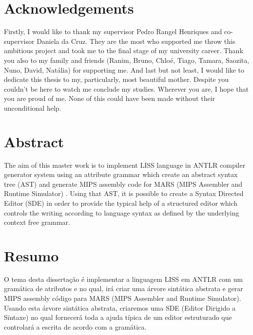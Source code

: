 \documentclass[
  oneside,
  11pt, a4paper,
  footinclude=true,
  headinclude=true,
  cleardoublepage=empty
]{scrbook}
\author{Damien da Silva Vaz}
\date{\myear} %
\begin{document}
	\umfrontcover	
	\umtitlepage
	
	\chapter*{Acknowledgements}
	Firstly, I would like to thank my supervisor Pedro Rangel Henriques and co-supervisor Daniela da Cruz. They are the most who supported me throw this ambitious project and took me to the final stage of my university career.\newline
Thank you also to my family and friends (Ranim, Bruno, Chloé, Tiago, Tamara, Saozita, Nuno, David, Natália) for supporting me.\newline
And last but not least, I would like to dedicate this thesis to my, particularly, most beautiful mother.
Despite you couldn't be here to watch me conclude my studies. Wherever you are, I hope that you are proud of me.	
None of this could have been made without their unconditional help.

	\chapter*{Abstract}
	The aim of this master work is to implement LISS language in ANTLR compiler generator system using an attribute grammar which create an abstract syntax tree (AST) and generate MIPS assembly code for MARS (MIPS Assembler and Runtime Simulator) .
Using that AST, it is possible to create a Syntax Directed Editor (SDE) in order to provide the typical help of a structured editor which controls the writing according to language syntax as defined by the underlying context free grammar.
	
	\cleardoublepage
	\chapter*{Resumo}
	O tema desta dissertação é implementar a linguagem LISS em ANTLR com um gramática de atributos e no qual, irá criar uma árvore sintática abstrata e gerar MIPS assembly código para MARS (MIPS Assembler and Runtime Simulator).
        Usando esta árvore sintática abstrata, criaremos uma SDE (Editor Dirigido a Sintaxe) no qual fornecerá toda a ajuda típica de um editor estruturado que controlará a escrita de acordo com a gramática.	
	
	\tableofcontents
	\listoffigures
	\listoftables
	\printglossary[type=\acronymtype]
	\clearpage
	\thispagestyle{empty}
\end{document}
